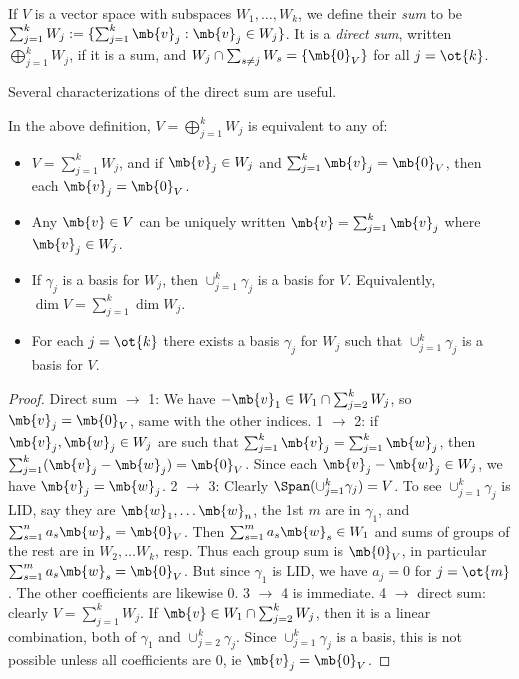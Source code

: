 \begin{defn}
If $V$ is a vector space with subspaces $W_1, \ldots,W_k$, we define their \emph{sum} to be $\sum_{j=1}^kW_j:= \{ \sum_{j=1}^k \mb{v}_j: \mb{v}_j \in W_j \}$. It is a \emph{direct sum}, written $\bigoplus_{j=1}^kW_j$, if it is a sum, and $W_j \cap \sum_{s \neq j}W_s= \{ \mb{0}_V \}$ for all $j= \ot{k}$.
\end{defn}\label{l:directsum}
Several characterizations of the direct sum are useful.
\begin{lem}
In the above definition, $V= \bigoplus_{j=1}^kW_j$ is equivalent to any of:
\begin{itemize}
\item $V= \sum_{j=1}^kW_j$, and if $\mb{v}_j \in W_j$ and $\sum_{j=1}^k \mb{v}_j= \mb{0}_V$, then each $\mb{v}_j= \mb{0}_V$.
\item Any $\mb{v} \in V$ can be uniquely written $\mb{v}= \sum_{j=1}^k \mb{v}_j$ where $\mb{v}_j \in W_j$.
\item If $\gamma_j$ is a basis for $W_j$, then $\cup_{j=1}^k \gamma_j$ is a basis for $V$. Equivalently, $\dim V= \sum_{j=1}^k \dim W_j$.
\item For each $j= \ot{k}$ there exists a basis $\gamma_j$ for $W_j$ such that $\cup_{j=1}^k \gamma_j$ is a basis for $V$.
\end{itemize}
\end{lem}
\begin{proof}
Direct sum $\to$ 1: We have $- \mb{v}_1 \in W_1 \cap \sum_{j=2}^kW_j$, so $\mb{v}_j= \mb{0}_V$, same with the other indices.
1 $\to$ 2: if $\mb{v}_j, \mb{w}_j \in W_j$ are such that $\sum_{j=1}^k \mb{v}_j= \sum_{j=1}^k \mb{w}_j$, then $\sum_{j=1}^k( \mb{v}_j- \mb{w}_j)= \mb{0}_V$. Since each $\mb{v}_j- \mb{w}_j \in W_j$, we have $\mb{v}_j= \mb{w}_j$.
2 $\to$ 3: Clearly $\Span( \cup_{j=1}^k \gamma_j)=V$. To see $\cup_{j=1}^k \gamma_j$ is LID, say they are $\mb{w}_1, \ldots \mb{w}_n$, the 1st $m$ are in $\gamma_1$, and $\sum_{s=1}^na_s \mb{w}_s= \mb{0}_V$.
Then $\sum_{s=1}^ma_s \mb{w}_s \in W_1$ and sums of groups of the rest are in $W_2, \ldots W_k$, resp. Thus each group sum is $\mb{0}_V$, in particular $\sum_{s=1}^ma_s \mb{w}_s= \mb{0}_V$. But since $\gamma_1$ is LID, we have $a_j=0$ for $j= \ot{m}$. The other coefficients are likewise 0.
3 $\to$ 4 is immediate. 4 $\to$ direct sum: clearly $V= \sum_{j=1}^kW_j$. If $\mb{v}\in W_1 \cap \sum_{j=2}^kW_j$, then it is a linear combination, both of $\gamma_1$ and $\cup_{j=2}^k \gamma_j$. Since $\cup_{j=1}^k \gamma_j$ is a basis, this is not possible unless all coefficients are 0, ie $\mb{v}_j= \mb{0}_V$.
\end{proof}
